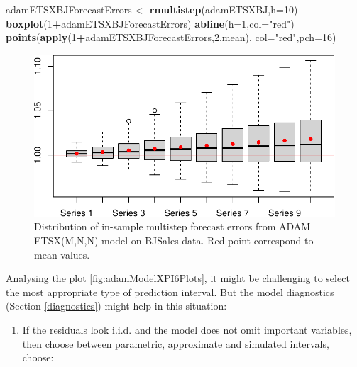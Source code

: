 \documentclass[]{book}
\newenvironment{Shaded}{\begin{snugshade}}{\end{snugshade}}
\newcommand{\DataTypeTok}[1]{\textcolor[rgb]{0.13,0.29,0.53}{#1}}
\newcommand{\DecValTok}[1]{\textcolor[rgb]{0.00,0.00,0.81}{#1}}
\newcommand{\KeywordTok}[1]{\textcolor[rgb]{0.13,0.29,0.53}{\textbf{#1}}}
\newcommand{\NormalTok}[1]{#1}
\newcommand{\OperatorTok}[1]{\textcolor[rgb]{0.81,0.36,0.00}{\textbf{#1}}}
\newcommand{\StringTok}[1]{\textcolor[rgb]{0.31,0.60,0.02}{#1}}
\providecommand{\tightlist}{%
  \setlength{\itemsep}{0pt}\setlength{\parskip}{0pt}}
\theoremstyle{definition}
\theoremstyle{definition}
\theoremstyle{definition}
\theoremstyle{definition}
\theoremstyle{remark}
\begin{document}
\begin{Shaded}
\begin{Highlighting}[]
\NormalTok{adamETSXBJForecastErrors <-}\StringTok{ }\KeywordTok{rmultistep}\NormalTok{(adamETSXBJ,}\DataTypeTok{h=}\DecValTok{10}\NormalTok{)}
\KeywordTok{boxplot}\NormalTok{(}\DecValTok{1}\OperatorTok{+}\NormalTok{adamETSXBJForecastErrors)}
\KeywordTok{abline}\NormalTok{(}\DataTypeTok{h=}\DecValTok{1}\NormalTok{,}\DataTypeTok{col=}\StringTok{"red"}\NormalTok{)}
\KeywordTok{points}\NormalTok{(}\KeywordTok{apply}\NormalTok{(}\DecValTok{1}\OperatorTok{+}\NormalTok{adamETSXBJForecastErrors,}\DecValTok{2}\NormalTok{,mean),}
       \DataTypeTok{col=}\StringTok{"red"}\NormalTok{,}\DataTypeTok{pch=}\DecValTok{16}\NormalTok{)}
\end{Highlighting}
\end{Shaded}

\begin{figure}
\centering
\includegraphics{Svetunkov--2022----ADAM_files/figure-latex/adamModelXForecastErrors-1.pdf}
\caption{\label{fig:adamModelXForecastErrors}Distribution of in-sample multistep forecast errors from ADAM ETSX(M,N,N) model on BJSales data. Red point correspond to mean values.}
\end{figure}

Analysing the plot \ref{fig:adamModelXPI6Plots}, it might be challenging to select the most appropriate type of prediction interval. But the model diagnostics (Section \ref{diagnostics}) might help in this situation:

\begin{enumerate}
\def\labelenumi{\arabic{enumi}.}
\tightlist
\item
  If the residuals look i.i.d. and the model does not omit important variables, then choose between parametric, approximate and simulated intervals, choose:
\end{enumerate}
\end{document}
